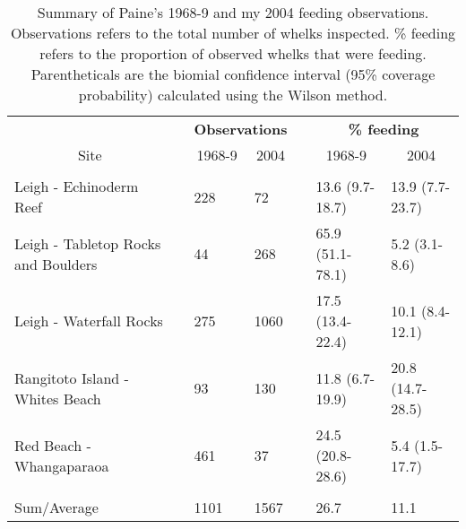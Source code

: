 \begin{table}[!htbp]
\caption{Summary of Paine's 1968-9 and my 2004 feeding observations.  
Observations refers to the total number of whelks inspected. \% feeding refers 
to the proportion of observed whelks that were feeding. Parentheticals are the 
biomial confidence interval (95\% coverage probability) calculated using the 
Wilson method.\label{tab:summ}} 
{\centering
\begin{tabular}{lcllcll}
\hline
\multicolumn{1}{c}{\bfseries }&\multicolumn{1}{c}{\bfseries }&\multicolumn{2}{c}{\bfseries Observations}&\multicolumn{1}{c}{\bfseries }&\multicolumn{2}{c}{\bfseries \% feeding}\tabularnewline
\cline{3-4} \cline{6-7}
\multicolumn{1}{c}{Site}&\multicolumn{1}{c}{}&\multicolumn{1}{c}{1968-9}&\multicolumn{1}{c}{2004}&\multicolumn{1}{c}{}&\multicolumn{1}{c}{1968-9}&\multicolumn{1}{c}{2004}\tabularnewline
\hline
&&&&&&\tabularnewline
Leigh - Echinoderm Reef&&228&72&&13.6 (9.7-18.7)&13.9 (7.7-23.7)\tabularnewline
Leigh - Tabletop Rocks and Boulders&&44&268&&65.9 (51.1-78.1)&5.2 (3.1-8.6)\tabularnewline
Leigh - Waterfall Rocks&&275&1060&&17.5 (13.4-22.4)&10.1 (8.4-12.1)\tabularnewline
Rangitoto Island - Whites Beach&&93&130&&11.8 (6.7-19.9)&20.8 (14.7-28.5)\tabularnewline
Red Beach - Whangaparaoa&&461&37&&24.5 (20.8-28.6)&5.4 (1.5-17.7)\tabularnewline
\hline
&&&&&&\tabularnewline
Sum/Average&&1101&1567&&26.7&11.1\tabularnewline
\hline
\end{tabular}}
\end{table}
